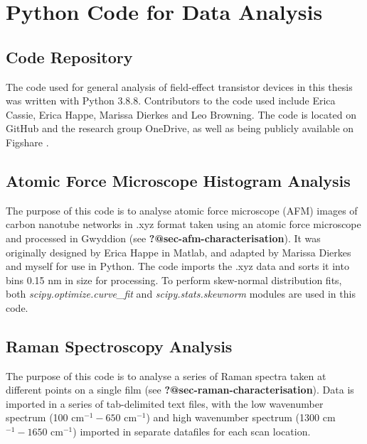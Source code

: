 \documentclass[
  a4paper,
]{scrbook}
\begin{document}
\hypertarget{python-code-for-data-analysis}{%
\chapter{Python Code for Data
Analysis}\label{python-code-for-data-analysis}}

\hypertarget{code-repository}{%
\section{Code Repository}\label{code-repository}}

The code used for general analysis of field-effect transistor devices in
this thesis was written with Python 3.8.8. Contributors to the code used
include Erica Cassie, Erica Happe, Marissa Dierkes and Leo Browning. The
code is located on GitHub and the research group OneDrive, as well as
being publicly available on Figshare \autocite{Treacher2024}.

\hypertarget{sec-histogram-analysis}{%
\section{Atomic Force Microscope Histogram
Analysis}\label{sec-histogram-analysis}}

The purpose of this code is to analyse atomic force microscope (AFM)
images of carbon nanotube networks in .xyz format taken using an atomic
force microscope and processed in Gwyddion (see
\textbf{?@sec-afm-characterisation}). It was originally designed by
Erica Happe in Matlab, and adapted by Marissa Dierkes and myself for use
in Python. The code imports the .xyz data and sorts it into bins 0.15 nm
in size for processing. To perform skew-normal distribution fits, both
\emph{scipy.optimize.curve\_fit} and \emph{scipy.stats.skewnorm} modules
are used in this code.

\hypertarget{sec-raman-analysis}{%
\section{Raman Spectroscopy Analysis}\label{sec-raman-analysis}}

The purpose of this code is to analyse a series of Raman spectra taken
at different points on a single film (see
\textbf{?@sec-raman-characterisation}). Data is imported in a series of
tab-delimited text files, with the low wavenumber spectrum (100
cm\(^{-1} - 650\) cm\(^{-1}\)) and high wavenumber spectrum (1300
cm\(^{-1} - 1650\) cm\(^{-1}\)) imported in separate datafiles for each
scan location.
\end{document}
